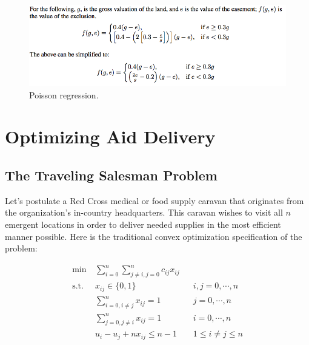 \documentclass[a0,final]{a0poster}
\begin{document}
\begin{multicols}{3}
\columnbreak


\begin{figure}[H]
\centering
\includegraphics[scale=0.75]{../write-up/figures/poisson-regression.png}
\caption{Poisson regression.}
\label{bosgraph}
\end{figure}

\vspace{-15mm}

\section*{Optimizing Aid Delivery}

\vspace{-6mm}

\subsection*{The Traveling Salesman Problem}

\vspace{-6mm}

Let's postulate a Red Cross medical or food supply caravan that originates from the organization's in-country headquarters. This caravan wishes to visit all $n$ emergent locations in order to deliver needed supplies in the most efficient manner possible. Here is the traditional convex optimization specification of the problem:\cite{Winston}

\vspace{-10mm}

\begin{align*}
\min &\sum_{i=0}^n \sum_{j\ne i,j=0}^nc_{ij}x_{ij} &&  \\
\mathrm{s.t.} \; \; & x_{ij} \in \{0, 1\} && i,j=0, \cdots, n \\
	& \sum_{i=0,i\ne j}^n x_{ij} = 1 && j=0, \cdots, n \\
	& \sum_{j=0,j\ne i}^n x_{ij} = 1 && i=0, \cdots, n \\
	&u_i-u_j +nx_{ij} \le n-1 && 1 \le i \ne j \le n
\end{align*}


\end{multicols}
\end{document}
